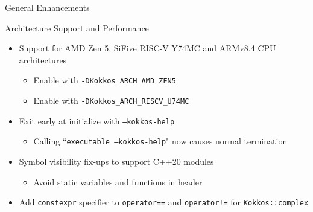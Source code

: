 
\begin{frame}[fragile]

  {\Huge General Enhancements}

  \vspace{10pt}

\end{frame}




\begin{frame}[fragile]{Architecture Support and Performance}
 \begin{itemize}
     \item Support for AMD Zen 5, SiFive RISC-V Y74MC and ARMv8.4 CPU architectures
   \begin{itemize}
       \item Enable with \texttt{-DKokkos\_ARCH\_AMD\_ZEN5} 
       \item Enable with \texttt{-DKokkos\_ARCH\_RISCV\_U74MC}
   \end{itemize}
  \item Exit early at initialize with \texttt{--kokkos-help}
    \begin{itemize}
      \item Calling ``\texttt{executable --kokkos-help}" now causes normal termination
   \end{itemize}  
  \item Symbol visibility fix-ups to support C++20 modules
    \begin{itemize}
      \item Avoid static variables and functions in header
    \end{itemize}
  \item Add \texttt{constexpr} specifier to \texttt{operator==} and \texttt{operator!=} for \texttt{Kokkos::complex}
 \end{itemize}
\end{frame}


